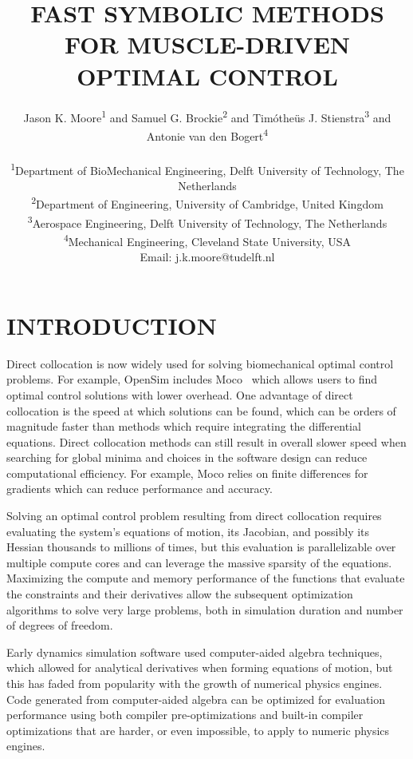 \documentclass[11pt,twocolumn]{article}
\title{\normalsize\textbf{
  FAST SYMBOLIC METHODS FOR MUSCLE-DRIVEN OPTIMAL CONTROL
}}
\author{
Jason K. Moore\textsuperscript{1} and
Samuel G. Brockie\textsuperscript{2} and
Timótheüs J. Stienstra\textsuperscript{3} and
Antonie van den Bogert\textsuperscript{4} \\
\\
\textsuperscript{1}Department of BioMechanical Engineering, Delft University of Technology, The Netherlands\\
\textsuperscript{2}Department of Engineering, University of Cambridge, United Kingdom\\
\textsuperscript{3}Aerospace Engineering, Delft University of Technology, The Netherlands\\
\textsuperscript{4}Mechanical Engineering, Cleveland State University, USA\\
Email: j.k.moore@tudelft.nl}
\date{}
\begin{document}
\pagestyle{fancy}
\lhead{}
\fancyfoot{}
\maketitle
\section*{INTRODUCTION}
\vspace{-1em}
%
Direct collocation is now widely used for solving biomechanical optimal control
problems. For example, OpenSim includes Moco~\cite{Dembia2019} which allows
users to find optimal control solutions with lower overhead. One advantage of
direct collocation is the speed at which solutions can be found, which can be
orders of magnitude faster than methods which require integrating the
differential equations. Direct collocation methods can still result in overall
slower speed when searching for global minima and choices in the software
design can reduce computational efficiency. For example, Moco relies on finite
differences for gradients which can reduce performance and accuracy.

Solving an optimal control problem resulting from direct collocation requires
evaluating the system's equations of motion, its Jacobian, and possibly its
Hessian thousands to millions of times, but this evaluation is parallelizable
over multiple compute cores and can leverage the massive sparsity of the
equations. Maximizing the compute and memory performance of the functions that
evaluate the constraints and their derivatives allow the subsequent
optimization algorithms to solve very large problems, both in simulation
duration and number of degrees of freedom.

Early dynamics simulation software used computer-aided algebra techniques,
which allowed for analytical derivatives when forming equations of motion, but
this has faded from popularity with the growth of numerical physics engines.
Code generated from computer-aided algebra can be optimized for evaluation
performance using both compiler pre-optimizations and built-in compiler
optimizations that are harder, or even impossible, to apply to numeric physics
engines.
\end{document}

